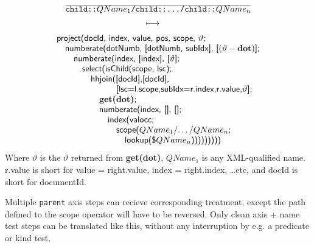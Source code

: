 \begin{equation}
\begin{array}{c}
\frac{}{\displaystyle \mbox{\texttt{child::}}QName_1\mbox{\texttt{/child::\ldots/child::}}QName_n} \\ 
\longmapsto \begin{array}{c}\mbox{\tiny } \\ \mbox{\tiny } \end{array} \\
\begin{array}{l}
\mbox{\textsf{project(docId, index, value, pos, scope, }}\vartheta\mbox{\textsf{;}} \\ \quad
\mbox{\textsf{numberate(dotNumb, [dotNumb, subIdx], [}}(\vartheta-\mbox{\textbf{dot}})\mbox{\textsf{];}} \\
\quad\quad 
\mbox{\textsf{numberate(index, [index], [}}\vartheta\mbox{\textsf{];}} \\ \quad\quad\quad
\mbox{\textsf{select(isChild(scope, lsc);}} \\ \quad \quad\quad\quad
\mbox{\textsf{hhjoin([docId],[docId],}} \\ \quad\quad\quad\quad\quad\quad\quad
\mbox{\textsf{[lsc=l.scope,subIdx=r.index,r.value,}}\vartheta\mbox{\textsf{];}}\\
\quad\quad\quad\quad\quad \mbox{\textbf{get(dot)}\textsf{;}} \\ \quad \quad\quad \quad\quad
\mbox{\textsf{numberate(index, [], [];}}\\ \quad\quad\quad\quad\quad\quad
\mbox{\textsf{index(valocc;}} \\ \quad\quad\quad\quad\quad\quad\quad
\mbox{\textsf{scope(}}QName_1\mbox{\textsf{/\ldots/}}QName_n\mbox{\textsf{;}}\\
\quad\quad\quad\quad\quad\quad\quad\quad
\mbox{\textsf{lookup(\$}}QName_n\mbox{\textsf{)))))))))}}
\end{array}
\end{array}
\label{rule:trans:TD:pathChild}
\end{equation}
Where $\vartheta$ is the $\vartheta$ returned from \textbf{get(dot)}, $QName_1$ is any XML-qualified name.
\textsf{r.value} is short for \textsf{value = right.value, index = right.index, \ldots etc}, and \textsf{docId} is
short for \textsf{documentId}.

Multiple \texttt{parent} axis steps can recieve corresponding treatment, except the path defined to the
\textsf{scope} operator will have to be reversed. Only clean axis + name test steps can be translated
like this, without any interruption by e.g. a predicate or kind test.

